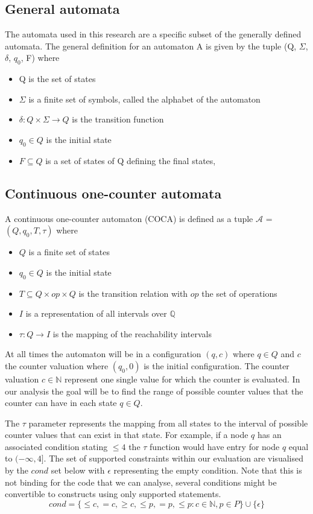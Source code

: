 \documentclass[12pt]{article}
\begin{document}
\subsection{General automata}
The automata used in this research are a specific subset of the generally defined automata. The general definition for an automaton A is given by the tuple (Q, $\Sigma$, $\delta$, $q_0$, F) where
\begin{itemize}
	\item Q is the set of states
	\item $\Sigma$ is a finite set of symbols, called the alphabet of the automaton
	\item $\delta: Q \times \Sigma \rightarrow Q$ is the transition function
	\item $q_0 \in Q$ is the initial state
	\item $F \subseteq Q$ is a set of states of Q defining the final states, 
\end{itemize}

\subsection{Continuous one-counter automata}
A continuous one-counter automaton (COCA) is defined as a tuple $\mathcal{A}$ = $(Q, q_0, T, \tau)$ where
\begin{itemize}
	\item $Q$ is a finite set of states
	\item $q_0 \in Q$ is the initial state
	\item $T \subseteq Q \times op \times Q$ is the transition relation with $op$ the set of operations
	\item $I$ is a representation of all intervals over $\mathbb{Q}$
	\item $\tau: Q \rightarrow I$ is the mapping of the reachability intervals
\end{itemize}

At all times the automaton will be in a configuration $(q, c)$ where $q \in Q$ and $c$ the counter valuation where $(q_0, 0)$ is the initial configuration. The counter valuation $c \in \mathbb{N}$ represent one single value for which the counter is evaluated. In our analysis the goal will be to find the range of possible counter values that the counter can have in each state $q \in Q$.

The $\tau$ parameter represents the mapping from all states to the interval of possible counter values that can exist in that state. For example, if a node $q$ has an associated condition stating $\leq 4$ the $\tau$ function would have entry for node $q$ equal to $(-\infty, 4]$. The set of supported constraints within our evaluation are visualised by the $cond$ set below with $\epsilon$ representing the empty condition. Note that this is not binding for the code that we can analyse, several conditions might be convertible to constructs using only supported statements.
\[
cond = \{\leq c, =c, \geq c, \leq p, =p, \leq p: c \in \mathbb{N}, p \in P\} \cup \{\epsilon\}
\]
\end{document}
